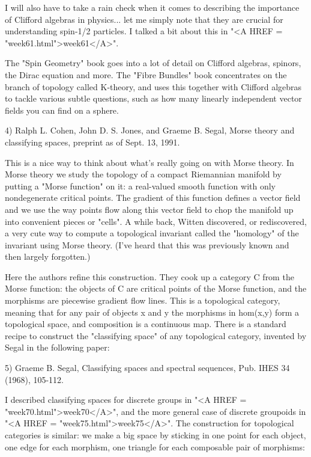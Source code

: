 I will also have to take a rain check when it comes to describing the
importance of Clifford algebras in physics... let me simply note that
they are crucial for understanding spin-1/2 particles.  I talked a bit
about this in "<A HREF = "week61.html">week61</A>".  

The "Spin Geometry" book goes into a lot of detail on Clifford algebras,
spinors, the Dirac equation and more.  The "Fibre Bundles" book
concentrates on the branch of topology called K-theory, and uses this
together with Clifford algebras to tackle various subtle questions, such
as how many linearly independent vector fields you can find on a sphere.

4) Ralph L. Cohen, John D. S. Jones, and Graeme B. Segal, Morse theory
and classifying spaces, preprint as of Sept. 13, 1991.

This is a nice way to think about what's really going on with Morse
theory.  In Morse theory we study the topology of a compact Riemannian
manifold by putting a "Morse function" on it: a real-valued smooth
function with only nondegenerate critical points.  The gradient of this
function defines a vector field and we use the way points flow along
this vector field to chop the manifold up into convenient pieces or
"cells".  A while back, Witten discovered, or rediscovered, a very cute
way to compute a topological invariant called the "homology" of the
invariant using Morse theory.  (I've heard that this was previously
known and then largely forgotten.)  

Here the authors refine this construction.  They cook up a category C
from the Morse function: the objects of C are critical points of the
Morse function, and the morphisms are piecewise gradient flow lines.
This is a topological category, meaning that for any pair of objects x
and y the morphisms in hom(x,y) form a topological space, and
composition is a continuous map.  There is a standard recipe to
construct the "classifying space" of any topological category, invented
by Segal in the following paper:

5) Graeme B. Segal, Classifying spaces and spectral sequences, Pub. IHES 34
(1968), 105-112.  

I described classifying spaces for discrete groups in "<A HREF = "week70.html">week70</A>", and the
more general case of discrete groupoids in "<A HREF = "week75.html">week75</A>".  The construction
for topological categories is similar: we make a big space by sticking
in one point for each object, one edge for each morphism, one triangle
for each composable pair of morphisms:


